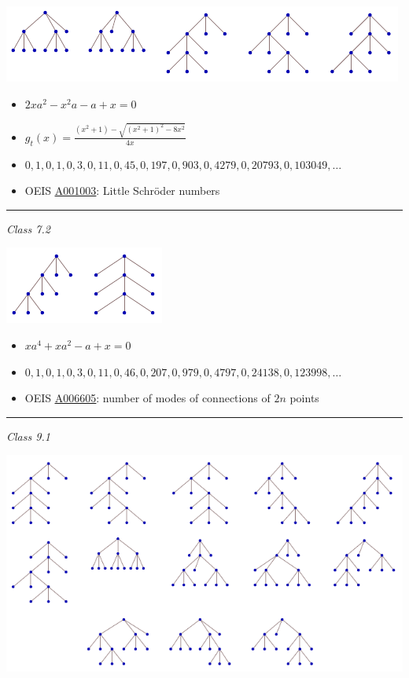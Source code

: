 \documentclass[12pt]{article}
\newcommand{\seqnum}[1]{\href{http://oeis.org/#1}{\underline{#1}}}
\begin{document}
\begin{center}
\includegraphics{ternary_class_7-1}
\end{center}

\begin{itemize}
\item $2xa^2-x^2a-a+x=0$
\item $g_t(x)=\frac{(x^2+1)- \sqrt{(x^2+1)^2-8x^2}}{4x}$
\item $0, 1, 0, 1, 0, 3, 0, 11, 0, 45, 0, 197, 0, 903, 0, 4279, 0, 20793, 0, 103049,\dots$
\item OEIS \seqnum{A001003}: Little Schr\"{o}der numbers
\end{itemize}

\hrule

\vspace{5mm}

\textit{Class 7.2}

\begin{center}
\includegraphics{ternary_class_7-2}
\end{center}

\begin{itemize}
\item $xa^4+xa^2-a+x=0$
\item $0, 1, 0, 1, 0, 3, 0, 11, 0, 46, 0, 207, 0, 979, 0, 4797, 0, 24138, 0, 123998,\dots$
\item OEIS \seqnum{A006605}: number of modes of connections of $2n$ points
\end{itemize}

\hrule
 
\vspace{5mm}

\textit{Class 9.1}

\begin{center}
\includegraphics{ternary_class_9-1}
\end{center}
\end{document}
